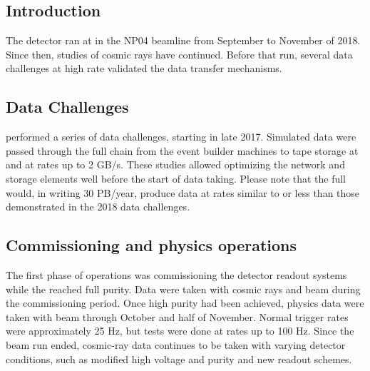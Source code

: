 \subsection{Introduction}

The  detector ran at  in the NP04 beamline from September to November of 2018. Since then, studies of cosmic rays have continued. Before that run, several data challenges at high rate validated the data transfer mechanisms. 

\subsection{Data Challenges}

 performed a series of data challenges, starting in late 2017.  Simulated data were passed through the full chain from the event builder machines to tape storage at  and  at rates up to 2 GB/s.  These studies allowed optimizing the network and storage elements well before the start of data taking.
Please note that the full   would, in writing 30 PB/year, produce data at rates similar to or less than those demonstrated in the 2018 data challenges. 

\subsection{Commissioning and physics operations}

The first phase of operations was commissioning the detector readout systems while the  reached full purity.  Data were taken with cosmic rays and beam during the commissioning period. Once high  purity had been achieved, physics data were  taken with beam through October and half of November. Normal trigger rates were approximately 25 Hz, but tests were done at rates up to 100 Hz. Since the beam run ended, cosmic-ray data continues to be taken with varying detector conditions, such as modified high voltage and purity and new readout schemes. 



